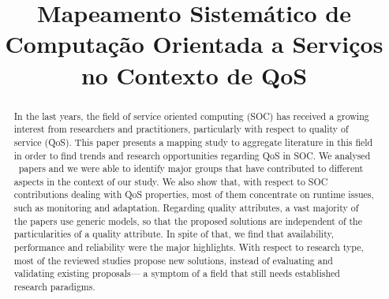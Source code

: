 \documentclass[conference]{IEEEtran}
\begin{document}
%
\title{Mapeamento Sistem\'{a}tico de Computa\c{c}\~{a}o Orientada a Servi\c{c}os no Contexto de QoS}


\author{
}


\maketitle


\begin{abstract}
In the last years, the field of service oriented computing (SOC) has received a growing interest from researchers and practitioners, particularly with respect to quality of service (QoS). This paper presents a mapping study to aggregate literature in this field in order to find trends and research opportunities regarding QoS in SOC. We analysed \AcceptedPubs~papers and we were able to identify major groups that have contributed to different aspects in the context of our study. We also show that, with respect to SOC contributions dealing with QoS properties, most of them concentrate on runtime issues, such as monitoring and adaptation. Regarding quality attributes, a vast majority of the papers use generic models, so that the proposed solutions are independent of the particularities of a quality attribute. In spite of that, we find that availability, performance and reliability were the major highlights. With respect to research type, most of the reviewed studies propose new solutions, instead of evaluating 
and validating existing proposals--- a symptom of a field that still needs established research paradigms.			
\end{abstract}
\end{document}
